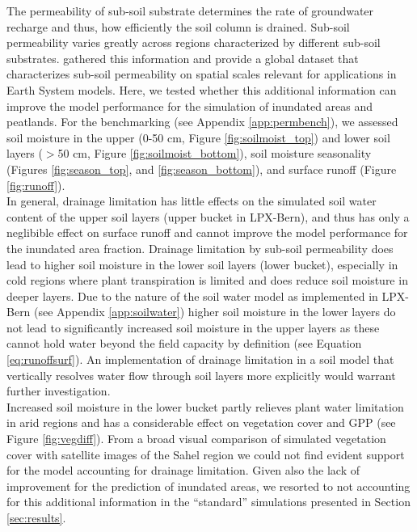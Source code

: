 The permeability of sub-soil substrate determines the rate of groundwater recharge and thus, how efficiently the soil column is drained. Sub-soil permeability varies greatly across regions characterized by different sub-soil substrates. \citet{gleeson11grl} gathered this information and provide a global dataset that characterizes sub-soil permeability on spatial scales relevant for applications in Earth System models. Here, we tested whether this additional information can improve the model performance for the simulation of inundated areas and peatlands. For the benchmarking (see Appendix \ref{app:permbench}), we assessed soil moisture in the upper (0-50 cm, Figure \ref{fig:soilmoist_top}) and lower soil layers ($>$50 cm, Figure \ref{fig:soilmoist_bottom}), soil moisture seasonality (Figures \ref{fig:season_top}, and \ref{fig:season_bottom}), and surface runoff (Figure \ref{fig:runoff}).\\
In general, drainage limitation has little effects on the simulated soil water content of the upper soil layers (upper bucket in LPX-Bern), and thus has only a neglibible effect on surface runoff and cannot improve the model performance for the inundated area fraction. Drainage limitation by sub-soil permeability does lead to higher soil moisture in the lower soil layers (lower bucket), especially in cold regions where plant transpiration is limited and does reduce soil moisture in deeper layers. Due to the nature of the soil water model as implemented in LPX-Bern (see Appendix \ref{app:soilwater}) higher soil moisture in the lower layers do not lead to significantly increased soil moisture in the upper layers as these cannot hold water beyond the field capacity by definition (see Equation \ref{eq:runoffsurf}). An implementation of drainage limitation in a soil model that vertically resolves water flow through soil layers more explicitly would warrant further investigation.\\
Increased soil moisture in the lower bucket partly relieves plant water limitation in arid regions and has a considerable effect on vegetation cover and GPP (see Figure \ref{fig:vegdiff}). From a broad visual comparison of simulated vegetation cover with satellite images of the Sahel region we could not find evident support for the model accounting for drainage limitation. Given also the lack of improvement for the prediction of inundated areas, we resorted to not accounting for this additional information in the ``standard'' simulations presented in Section \ref{sec:results}.

\clearpage

